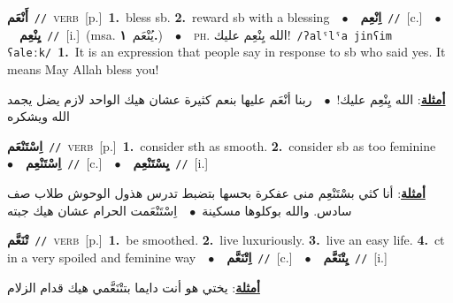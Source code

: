 \documentclass[10pt,a4paper,twoside]{article} %
\begin{document}
\begin{multicols}{2}
{\setlength\topsep{0pt}\textbf{\foreignlanguage{arabic}{أَنْعَم}}\ {\color{gray}\texttt{//}\color{black}}\ \textsc{verb}\ [p.]\ \textbf{1.}~bless sb.  \textbf{2.}~reward sb with a blessing\ \ $\bullet$\ \ \setlength\topsep{0pt}\textbf{\foreignlanguage{arabic}{اِنْعِم}}\ {\color{gray}\texttt{//}\color{black}}\ [c.]\ \ $\bullet$\ \ \setlength\topsep{0pt}\textbf{\foreignlanguage{arabic}{يِنْعِم}}\ {\color{gray}\texttt{//}\color{black}}\ [i.]\ \color{gray}(msa. \foreignlanguage{arabic}{يُنْعَم}~\foreignlanguage{arabic}{\textbf{١.}})\color{black}\ \ $\bullet$\ \ \textsc{ph.} \color{gray} \foreignlanguage{arabic}{الله يِنْعِم عليك!}\color{black}\ {\color{gray}\texttt{/{\sffamily ʔalˤlˤa jinʕim ʕaleːk}/}\color{black}}\ \textbf{1.}~It is an expression that people say in response to sb who said yes. It means May Allah bless you!\  \begin{flushright}\color{gray}\foreignlanguage{arabic}{\textbf{\underline{\foreignlanguage{arabic}{أمثلة}}}: الله يِنْعِم عليك!\ $\bullet$\ \  ربنا أنْعَم عليها بنعم كثيرة عشان هيك الواحد لازم يضل يجمد الله ويشكره}\end{flushright}\color{black}} \vspace{2mm}

{\setlength\topsep{0pt}\textbf{\foreignlanguage{arabic}{اِسْتَنْعَم}}\ {\color{gray}\texttt{//}\color{black}}\ \textsc{verb}\ [p.]\ \textbf{1.}~consider sth as smooth.  \textbf{2.}~consider sb as too feminine\ \ $\bullet$\ \ \setlength\topsep{0pt}\textbf{\foreignlanguage{arabic}{اِسْتَنْعِم}}\ {\color{gray}\texttt{//}\color{black}}\ [c.]\ \ $\bullet$\ \ \setlength\topsep{0pt}\textbf{\foreignlanguage{arabic}{يِسْتَنْعِم}}\ {\color{gray}\texttt{//}\color{black}}\ [i.]\  \begin{flushright}\color{gray}\foreignlanguage{arabic}{\textbf{\underline{\foreignlanguage{arabic}{أمثلة}}}: أنا كثي بسْتَنْعِم منى عفكرة بحسها بتضبط تدرس هذول الوحوش طلاب صف سادس. والله بوكلوها مسكينة\ $\bullet$\ \  اِسْتَنْعَمت الحرام عشان هيك جبته}\end{flushright}\color{black}} \vspace{2mm}

{\setlength\topsep{0pt}\textbf{\foreignlanguage{arabic}{تْنَعَّم}}\ {\color{gray}\texttt{//}\color{black}}\ \textsc{verb}\ [p.]\ \textbf{1.}~be smoothed.  \textbf{2.}~live luxuriously.  \textbf{3.}~live an easy life.  \textbf{4.}~ct in a very spoiled and feminine way\ \ $\bullet$\ \ \setlength\topsep{0pt}\textbf{\foreignlanguage{arabic}{اِتْنَعَّم}}\ {\color{gray}\texttt{//}\color{black}}\ [c.]\ \ $\bullet$\ \ \setlength\topsep{0pt}\textbf{\foreignlanguage{arabic}{يِتْنَعَّم}}\ {\color{gray}\texttt{//}\color{black}}\ [i.]\  \begin{flushright}\color{gray}\foreignlanguage{arabic}{\textbf{\underline{\foreignlanguage{arabic}{أمثلة}}}: يختي هو أنت دايما بتتْنَعَّمي هيك قدام الزلام}\end{flushright}\color{black}} \vspace{2mm}


\end{multicols}
\end{document}
